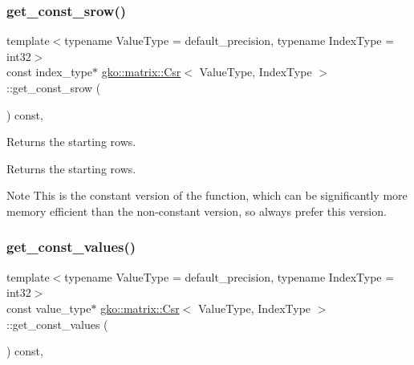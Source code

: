 \subsubsection{\texorpdfstring{get\+\_\+const\+\_\+srow()}{get\_const\_srow()}}
{\footnotesize\ttfamily template$<$typename Value\+Type = default\+\_\+precision, typename Index\+Type = int32$>$ \\
const index\+\_\+type$\ast$ \hyperlink{classgko_1_1matrix_1_1Csr}{gko\+::matrix\+::\+Csr}$<$ Value\+Type, Index\+Type $>$\+::get\+\_\+const\+\_\+srow (\begin{DoxyParamCaption}{ }\end{DoxyParamCaption}) const\hspace{0.3cm}{\ttfamily [inline]}, {\ttfamily [noexcept]}}



Returns the starting rows. 

\begin{DoxyReturn}{Returns}
the starting rows.
\end{DoxyReturn}
\begin{DoxyNote}{Note}
This is the constant version of the function, which can be significantly more memory efficient than the non-\/constant version, so always prefer this version. 
\end{DoxyNote}
\mbox{\label{classgko_1_1matrix_1_1Csr_a1801347665214bbefc837b44ba0695ff}} 
\subsubsection{\texorpdfstring{get\+\_\+const\+\_\+values()}{get\_const\_values()}}
{\footnotesize\ttfamily template$<$typename Value\+Type = default\+\_\+precision, typename Index\+Type = int32$>$ \\
const value\+\_\+type$\ast$ \hyperlink{classgko_1_1matrix_1_1Csr}{gko\+::matrix\+::\+Csr}$<$ Value\+Type, Index\+Type $>$\+::get\+\_\+const\+\_\+values (\begin{DoxyParamCaption}{ }\end{DoxyParamCaption}) const\hspace{0.3cm}{\ttfamily [inline]}, {\ttfamily [noexcept]}}



